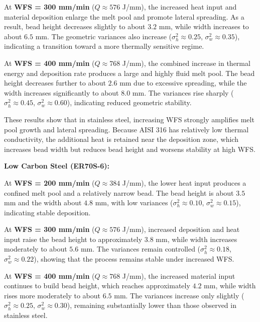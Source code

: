 \documentclass[conference]{IEEEtran}
\begin{document}
At \textbf{WFS = 300 mm/min} ($Q \approx 576$ J/mm), the increased heat input and material deposition enlarge the melt pool and promote lateral spreading. As a result, bead height decreases slightly to about $3.2$ mm, while width increases to about $6.5$ mm. The geometric variances also increase ($\sigma_h^2 \approx 0.25$, $\sigma_w^2 \approx 0.35$), indicating a transition toward a more thermally sensitive regime.

At \textbf{WFS = 400 mm/min} ($Q \approx 768$ J/mm), the combined increase in thermal energy and deposition rate produces a large and highly fluid melt pool. The bead height decreases further to about $2.6$ mm due to excessive spreading, while the width increases significantly to about $8.0$ mm. The variances rise sharply ($\sigma_h^2 \approx 0.45$, $\sigma_w^2 \approx 0.60$), indicating reduced geometric stability.

These results show that in stainless steel, increasing WFS strongly amplifies melt pool growth and lateral spreading. Because AISI 316 has relatively low thermal conductivity, the additional heat is retained near the deposition zone, which increases bead width but reduces bead height and worsens stability at high WFS.


\textbf{Low Carbon Steel (ER70S-6):}

At \textbf{WFS = 200 mm/min} ($Q \approx 384$ J/mm), the lower heat input produces a confined melt pool and a relatively narrow bead. The bead height is about $3.5$ mm and the width about $4.8$ mm, with low variances ($\sigma_h^2 \approx 0.10$, $\sigma_w^2 \approx 0.15$), indicating stable deposition.

At \textbf{WFS = 300 mm/min} ($Q \approx 576$ J/mm), increased deposition and heat input raise the bead height to approximately $3.8$ mm, while width increases moderately to about $5.6$ mm. The variances remain controlled ($\sigma_h^2 \approx 0.18$, $\sigma_w^2 \approx 0.22$), showing that the process remains stable under increased WFS.

At \textbf{WFS = 400 mm/min} ($Q \approx 768$ J/mm), the increased material input continues to build bead height, which reaches approximately $4.2$ mm, while width rises more moderately to about $6.5$ mm. The variances increase only slightly ($\sigma_h^2 \approx 0.25$, $\sigma_w^2 \approx 0.30$), remaining substantially lower than those observed in stainless steel.
\end{document}
